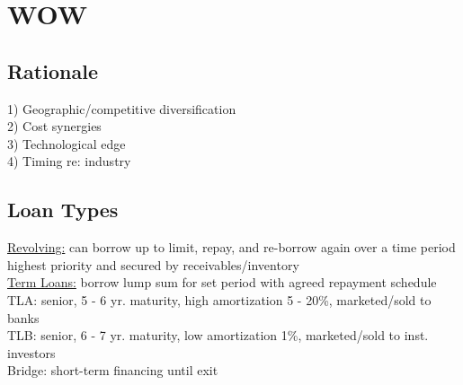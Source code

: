 \section{WOW}
	\subsection*{Rationale}
	1) Geographic/competitive diversification\\
	2) Cost synergies\\
	3) Technological edge\\
	4) Timing re: industry
	
	\subsection*{Loan Types}
	\underline{Revolving:} can borrow up to limit, repay, and re-borrow again over a time period\\
	highest priority and secured by receivables/inventory\\
	\underline{Term Loans:} borrow lump sum for set period with agreed repayment schedule\\
	TLA: senior, 5 - 6 yr. maturity, high amortization 5 - 20\%, marketed/sold to banks\\
	TLB: senior, 6 - 7 yr. maturity, low amortization 1\%, marketed/sold to inst. investors\\
	Bridge: short-term financing until exit
	